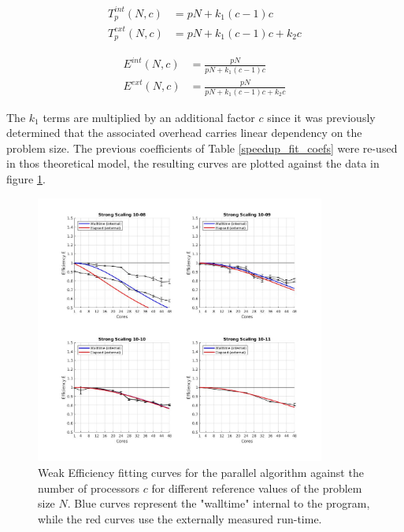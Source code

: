 \documentclass{article}
\begin{document}
\begin{minipage}{0.5\linewidth}
\begin{equation*}
\begin{split}
T_p^{int} \left( N, c \right) &= p N + k_1 \left( c - 1 \right) c \\
T_p^{ext} \left( N, c \right) &= p N + k_1 \left( c - 1 \right)c + k_2 c 
\end{split}
\end{equation*}
\end{minipage}
\begin{minipage}{0.5\linewidth}
\begin{equation}\label{weak_eff_model}
\begin{split}
E^{int} \left( N, c \right) &= \frac{p N}{p N + k_1 \left( c - 1 \right) c} \\
E^{ext} \left( N, c \right) &= \frac{p N}{p N + k_1 \left( c - 1 \right)c + k_2 c } 
\end{split}
\end{equation}
\end{minipage}

The $k_1$ terms are multiplied by an additional factor $c$ since it was previously determined that the associated overhead carries linear dependency on the problem size. The previous coefficients of Table \ref{speedup_fit_coefs} were re-used in thos theoretical model, the resulting curves are plotted against the data in figure \ref{weak_scaling_fit}.


\begin{figure}[H]
\centering
\includegraphics[width=0.85\textwidth]{weak_scaling_fit}
\caption{Weak Efficiency fitting curves for the parallel algorithm against the number of processors $c$ for different reference values of the problem size $N$. Blue curves represent the "walltime" internal to the program, while the red curves use the externally measured run-time.  }
\label{weak_scaling_fit}
\end{figure}
\end{document}
